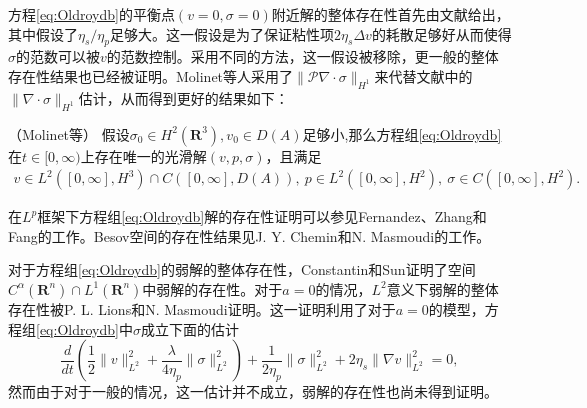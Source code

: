 方程\eqref{eq:Oldroydb}的平衡点$(v=0,\sigma=0)$附近解的整体存在性首先由文献\cite{guillope1990existence}给出，其中假设了$\eta_s/\eta_p$足够大。这一假设是为了保证粘性项$ 2 \eta_s \Delta v$的耗散足够好从而使得$\sigma$的范数可以被$v$的范数控制。采用不同的方法，这一假设被移除，更一般的整体存在性结果也已经被证明\cite{chupin2004some,molinet2004global,molinet2004existence}。Molinet等人采用了$\|\mathcal{P}\nabla \cdot \sigma\|_{H^1}$来代替文献\cite{guillope1990existence}中的$\|\nabla \cdot \sigma\|_{H^1}$估计，从而得到更好的结果如下\cite{molinet2004global,molinet2004existence}：
\begin{theorem}（Molinet等\cite{molinet2004existence}）
	假设$\sigma_0 \in H^2(\mathbf{R}^3),v_0 \in D(A)$足够小,那么方程组\eqref{eq:Oldroydb}在$t\in [0,\infty)$上存在唯一的光滑解$(v,p,\sigma)$，且满足
	\begin{eqnarray*}
		v \in L^2([0,\infty],H^3) \cap C([0,\infty],D(A)), \ p \in L^2([0,\infty],H^2), \ \sigma \in C([0,\infty],H^2).
	\end{eqnarray*}
\end{theorem}

在$L^p$框架下方程组\eqref{eq:Oldroydb}解的存在性证明可以参见Fernandez、Zhang和Fang的工作\cite{fernandez1998some,zhang2012global}。Besov空间的存在性结果见J. Y. Chemin和N. Masmoudi的工作\cite{chemin2001lifespan}。

对于方程组\eqref{eq:Oldroydb}的弱解的整体存在性，Constantin和Sun证明了空间$C^\alpha(\mathbf{R}^n) \cap L^1(\mathbf{R}^n)$中弱解的存在性\cite{constantin2010remarks,saut2012lectures}。对于$a=0$的情况，$L^2$意义下弱解的整体存在性被P. L. Lions和N. Masmoudi证明\cite{lions2000global}。这一证明利用了对于$a=0$的模型，方程组\eqref{eq:Oldroydb}中$\sigma$成立下面的估计
\begin{equation*}
	\frac{d}{dt} \left(\frac{1}{2} \|v\|_{L^2}^2 +  \frac{\lambda}{4 \eta_p} \|\sigma\|_{L^2}^2 \right) + \frac{1}{2\eta_p} \|\sigma\|_{L^2}^2 + {2 \eta_s} \|\nabla v\|_{L^2}^2 = 0,
\end{equation*}
然而由于对于一般的情况，这一估计并不成立，弱解的存在性也尚未得到证明\cite{saut2012lectures}。

